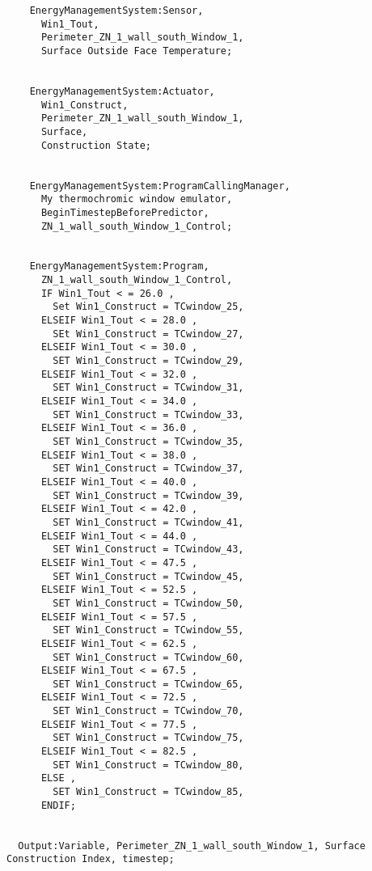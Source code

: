 \begin{lstlisting}
    EnergyManagementSystem:Sensor,
      Win1_Tout,
      Perimeter_ZN_1_wall_south_Window_1,
      Surface Outside Face Temperature;


    EnergyManagementSystem:Actuator,
      Win1_Construct,
      Perimeter_ZN_1_wall_south_Window_1,
      Surface,
      Construction State;


    EnergyManagementSystem:ProgramCallingManager,
      My thermochromic window emulator,
      BeginTimestepBeforePredictor,
      ZN_1_wall_south_Window_1_Control;


    EnergyManagementSystem:Program,
      ZN_1_wall_south_Window_1_Control,
      IF Win1_Tout < = 26.0 ,
        Set Win1_Construct = TCwindow_25,
      ELSEIF Win1_Tout < = 28.0 ,
        SEt Win1_Construct = TCwindow_27,
      ELSEIF Win1_Tout < = 30.0 ,
        SET Win1_Construct = TCwindow_29,
      ELSEIF Win1_Tout < = 32.0 ,
        SET Win1_Construct = TCwindow_31,
      ELSEIF Win1_Tout < = 34.0 ,
        SET Win1_Construct = TCwindow_33,
      ELSEIF Win1_Tout < = 36.0 ,
        SET Win1_Construct = TCwindow_35,
      ELSEIF Win1_Tout < = 38.0 ,
        SET Win1_Construct = TCwindow_37,
      ELSEIF Win1_Tout < = 40.0 ,
        SET Win1_Construct = TCwindow_39,
      ELSEIF Win1_Tout < = 42.0 ,
        SET Win1_Construct = TCwindow_41,
      ELSEIF Win1_Tout < = 44.0 ,
        SET Win1_Construct = TCwindow_43,
      ELSEIF Win1_Tout < = 47.5 ,
        SET Win1_Construct = TCwindow_45,
      ELSEIF Win1_Tout < = 52.5 ,
        SET Win1_Construct = TCwindow_50,
      ELSEIF Win1_Tout < = 57.5 ,
        SET Win1_Construct = TCwindow_55,
      ELSEIF Win1_Tout < = 62.5 ,
        SET Win1_Construct = TCwindow_60,
      ELSEIF Win1_Tout < = 67.5 ,
        SET Win1_Construct = TCwindow_65,
      ELSEIF Win1_Tout < = 72.5 ,
        SET Win1_Construct = TCwindow_70,
      ELSEIF Win1_Tout < = 77.5 ,
        SET Win1_Construct = TCwindow_75,
      ELSEIF Win1_Tout < = 82.5 ,
        SET Win1_Construct = TCwindow_80,
      ELSE ,
        SET Win1_Construct = TCwindow_85,
      ENDIF;


  Output:Variable, Perimeter_ZN_1_wall_south_Window_1, Surface Construction Index, timestep;
\end{lstlisting}
